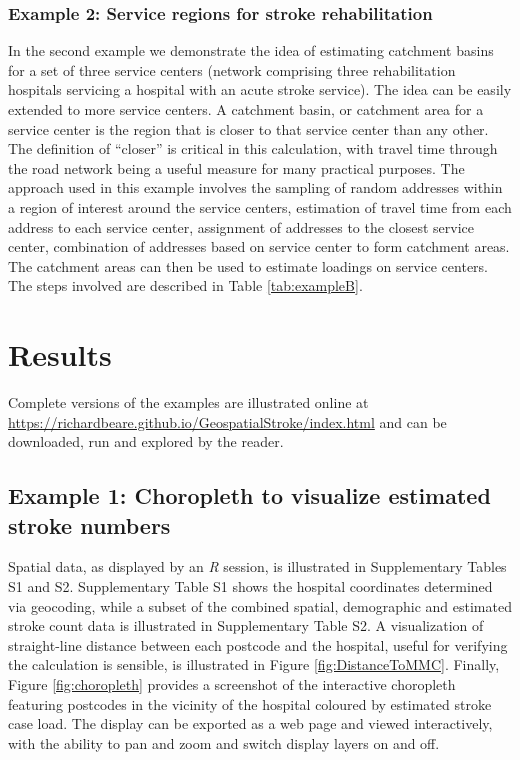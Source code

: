 \documentclass[utf8]{frontiersHLTH}
\begin{document}
\subsubsection{Example 2: Service regions for stroke rehabilitation}\label{example-2-service-regions-for-stroke-rehabilitation} 
In the second example we demonstrate the idea of estimating catchment
basins for a set of three service centers (network comprising three
rehabilitation hospitals servicing a hospital with an acute stroke
service). The idea can be easily extended to more service centers. A
catchment basin, or catchment area for a service center is the region
that is closer to that service center than any other. The definition
of ``closer'' is critical in this calculation, with travel time
through the road network being a useful measure for many practical
purposes. The approach used in this example involves the sampling of
random addresses within a region of interest around the service
centers, estimation of travel time from each address to each service
center, assignment of addresses to the closest service center,
combination of addresses based on service center to form catchment
areas. The catchment areas can then be used to estimate loadings on
service centers. The steps involved are described in Table
\ref{tab:exampleB}.

\section{Results} 
Complete versions of the examples are illustrated online at
\href{https://richardbeare.github.io/GeospatialStroke/index.html}{https://richardbeare.github.io/GeospatialStroke/index.html}
and can be downloaded, run and explored by the reader.

\subsection{Example 1: Choropleth to visualize estimated stroke numbers} 
Spatial data, as displayed by an {\em R} session, is illustrated in
Supplementary Tables S1 and S2. Supplementary Table S1 shows the
hospital coordinates determined via geocoding, while a subset of the
combined spatial, demographic and estimated stroke count data is
illustrated in Supplementary Table S2. A visualization of
straight-line distance between each postcode and the hospital, useful
for verifying the calculation is sensible, is illustrated in Figure
\ref{fig:DistanceToMMC}. Finally, Figure \ref{fig:choropleth} provides
a screenshot of the interactive choropleth featuring postcodes in the
vicinity of the hospital coloured by estimated stroke case load. The
display can be exported as a web page and viewed interactively, with
the ability to pan and zoom and switch display layers on and off.
\end{document}
